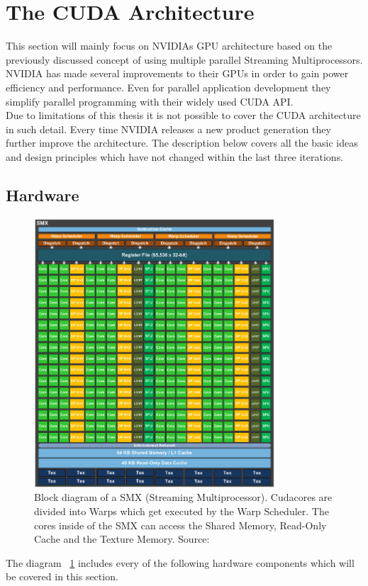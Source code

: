 \documentclass[draft, final]{vutinfth} %
\begin{document}
	\section{The CUDA Architecture}
		This section will mainly focus on NVIDIAs GPU architecture based on the previously discussed concept of using multiple parallel Streaming Multiprocessors. NVIDIA has made several improvements to their GPUs in order to gain power efficiency and performance. Even for parallel application development they simplify parallel programming with their widely used CUDA API.\\
		Due to limitations of this thesis it is not possible to cover the CUDA architecture in such detail. Every time NVIDIA releases a new product generation they further improve the architecture. The description below covers all the basic ideas and design principles which have not changed within the last three iterations.

		\subsection{Hardware}
			\begin{figure}[!ht]
			    \centering
			    \includegraphics[width=0.8\textwidth,keepaspectratio=true]{images/CUDA-SMX-Unit.png}
			    \caption{Block diagram of a SMX (Streaming Multiprocessor). Cudacores are divided into Warps which get executed by the Warp Scheduler. The cores inside of the SMX can access the Shared Memory, Read-Only Cache and the Texture Memory. Source: \cite{nvidia_kepler_2012}}
			    \label{fig:smx}
			\end{figure}
			The diagram ~\ref{fig:smx} includes every of the following hardware components which will be covered in this section.
\end{document}
